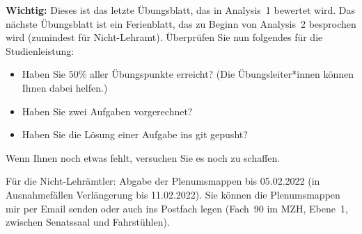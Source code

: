 \bigskip

\begin{lsg}
\end{lsg}

 


\vspace*{.5cm}


\textbf{\LARGE Wichtig:} Dieses ist das letzte \"Ubungsblatt, das in Analysis~1 
bewertet wird. Das n\"achste \"Ubungsblatt ist ein Ferienblatt, das zu Beginn 
von Analysis~2 besprochen wird (zumindest f\"ur Nicht-Lehramt). \"Uberpr\"ufen 
Sie nun folgendes f\"ur die Studienleistung:
\begin{itemize}
\item Haben Sie $50\%$ aller \"Ubungspunkte erreicht? (Die \"Ubungsleiter*innen 
k\"onnen Ihnen dabei helfen.)
\item Haben Sie zwei Aufgaben vorgerechnet?
\item Haben Sie die L\"osung einer Aufgabe ins git gepusht?
\end{itemize}
Wenn Ihnen noch etwas fehlt, versuchen Sie es noch zu schaffen. 

F\"ur die Nicht-Lehr\"amtler: Abgabe der Plenumsmappen bis 05.02.2022 (in 
Ausnahmef\"allen Verl\"angerung bis 11.02.2022). Sie k\"onnen die Plenumsmappen 
mir per Email senden oder auch ins Postfach legen (Fach~90 im MZH, Ebene~1, 
zwischen Senatssaal und Fahrst\"uhlen).

\setlength{\parindent}{0pt}


